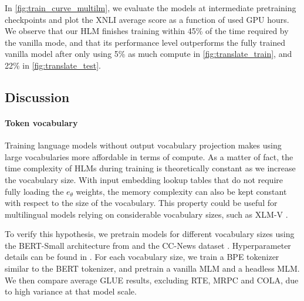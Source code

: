 In \autoref{fig:train_curve_multilm}, we evaluate the models at intermediate %
pretraining checkpoints
and plot the XNLI average score as a function of used GPU hours. We observe that our HLM finishes training within 45\% of the time required by the vanilla %
mode, and that its performance level outperforms
the fully trained vanilla model after only using 5\% as much compute in \autoref{fig:translate_train}, and 22\% in \autoref{fig:translate_test}.




\subsection{Discussion}
\label{sec:discussion}
\paragraph{Token vocabulary} Training language models without output vocabulary projection makes using large vocabularies more affordable in terms of compute. As a matter of fact, the time complexity of HLMs during training is theoretically constant as we increase the vocabulary size. With input embedding lookup tables that do not require fully loading the $e_\theta$ weights, the memory complexity can also be kept constant with respect to the size of the vocabulary. This property could be useful for multilingual models relying on considerable vocabulary sizes, such as XLM-V \citep{2023arXiv230110472L}.

To verify this hypothesis, we pretrain models for different vocabulary sizes using the BERT-Small architecture from \citet{turc2020wellread} and the CC-News dataset \citep{Hamborg2017}. Hyperparameter details can be found in . For each vocabulary size, we train a BPE tokenizer similar to the BERT tokenizer, and pretrain a vanilla MLM and a headless MLM. We then compare average GLUE results, excluding RTE, MRPC and COLA, due to high variance at that model scale.

